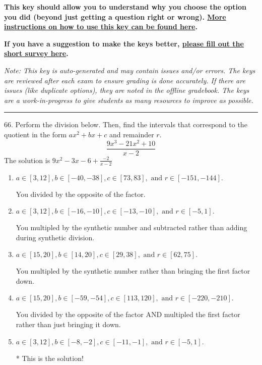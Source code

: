 \documentclass{extbook}[14pt]
\begin{document}
\textbf{This key should allow you to understand why you choose the option you did (beyond just getting a question right or wrong). \href{https://xronos.clas.ufl.edu/mac1105spring2020/courseDescriptionAndMisc/Exams/LearningFromResults}{More instructions on how to use this key can be found here}.}

\textbf{If you have a suggestion to make the keys better, \href{https://forms.gle/CZkbZmPbC9XALEE88}{please fill out the short survey here}.}

\textit{Note: This key is auto-generated and may contain issues and/or errors. The keys are reviewed after each exam to ensure grading is done accurately. If there are issues (like duplicate options), they are noted in the offline gradebook. The keys are a work-in-progress to give students as many resources to improve as possible.}

\rule{\textwidth}{0.4pt}

66. Perform the division below. Then, find the intervals that correspond to the quotient in the form $ax^2+bx+c$ and remainder $r$.
\[ \frac{9x^{3} -21 x^{2} + 10}{x -2} \] 
The solution is $ 9x^{2} -3 x -6 + \frac{-2}{x -2} $ 

\begin{enumerate}[label=\Alph*.] 
\item $ a \in [3, 12], b \in [-40, -38], c \in [73, 83], \text{ and } r \in [-151, -144]. $ 

  You divided by the opposite of the factor. 
\item $ a \in [3, 12], b \in [-16, -10], c \in [-13, -10], \text{ and } r \in [-5, 1]. $ 

  You multipled by the synthetic number and subtracted rather than adding during synthetic division. 
\item $ a \in [15, 20], b \in [14, 20], c \in [29, 38], \text{ and } r \in [62, 75]. $ 

  You multipled by the synthetic number rather than bringing the first factor down. 
\item $ a \in [15, 20], b \in [-59, -54], c \in [113, 120], \text{ and } r \in [-220, -210]. $ 

  You divided by the opposite of the factor AND multipled the first factor rather than just bringing it down. 
\item $ a \in [3, 12], b \in [-8, -2], c \in [-11, -1], \text{ and } r \in [-5, 1]. $ 

 * This is the solution! 
\end{enumerate} 
 
\end{document}
